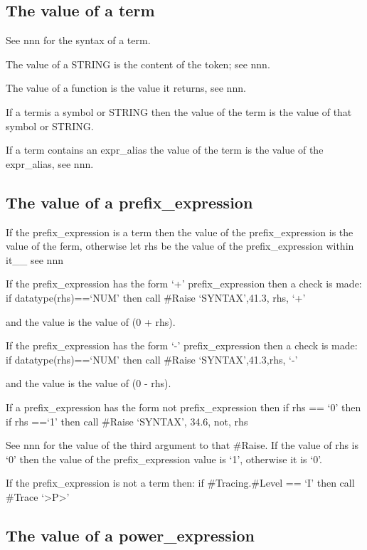\subsection{The value of a term}\label{the-value-of-a-term}

See nnn for the syntax of a term.

The value of a STRING is the content of the token; see nnn.

The value of a function is the value it returns, see nnn.

If a termis a symbol or STRING then the value of the term is the value
of that symbol or STRING.

If a term contains an expr\_alias the value of the term is the value of
the expr\_alias, see nnn.

\subsection{The value of a
prefix\_expression}\label{the-value-of-a-prefix_expression}

If the prefix\_expression is a term then the value of the
prefix\_expression is the value of the ferm, otherwise let rhs be the
value of the prefix\_expression within it\_\_ see nnn

If the prefix\_expression has the form `+' prefix\_expression then a
check is made: if datatype(rhs)==`NUM' then call \#Raise `SYNTAX',41.3,
rhs, `+'

and the value is the value of (0 + rhs).

If the prefix\_expression has the form `-' prefix\_expression then a
check is made: if datatype(rhs)==`NUM' then call \#Raise
`SYNTAX',41.3,rhs, `-'

and the value is the value of (0 - rhs).

If a prefix\_expression has the form not prefix\_expression then if rhs
== `0' then if rhs ==`1' then call \#Raise `SYNTAX', 34.6, not, rhs

See nnn for the value of the third argument to that \#Raise. If the
value of rhs is `0' then the value of the prefix\_expression value is
`1', otherwise it is `0'.

If the prefix\_expression is not a term then: if \#Tracing.\#Level ==
`I' then call \#Trace `\textgreater P\textgreater{}'

\subsection{The value of a
power\_expression}\label{the-value-of-a-power_expression}

